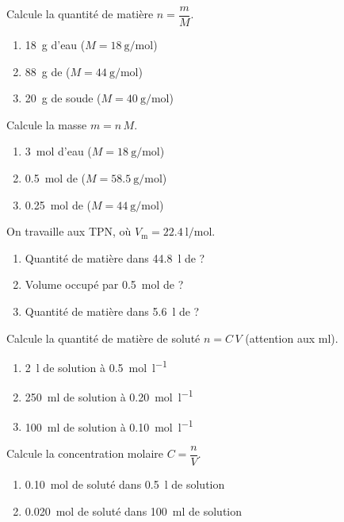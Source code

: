 \documentclass[11pt,a4paper]{article}
\begin{document}
\begin{exo}
Calcule la quantité de matière $n=\dfrac{m}{M}$.
\begin{enumerate}[label=\alph*)]
  \item \qty{18}{\gram} d'eau  \quad ($M=\qty{18}{\gram\per\mole}$)
  \item \qty{88}{\gram} de  \quad ($M=\qty{44}{\gram\per\mole}$)
  \item \qty{20}{\gram} de soude  \quad ($M=\qty{40}{\gram\per\mole}$)
\end{enumerate}
\end{exo}

\begin{exo}
Calcule la masse $m=n\,M$.
\begin{enumerate}[label=\alph*)]
  \item \qty{3}{\mole} d'eau \quad ($M=\qty{18}{\gram\per\mole}$)
  \item \qty{0.5}{\mole} de  \quad ($M=\qty{58.5}{\gram\per\mole}$)
  \item \qty{0.25}{\mole} de  \quad ($M=\qty{44}{\gram\per\mole}$)
\end{enumerate}
\end{exo}

\begin{exo}
On travaille aux TPN, où $V_{\mathrm{m}}=\qty{22.4}{\litre\per\mole}$.
\begin{enumerate}[label=\alph*)]
  \item Quantité de matière dans \qty{44.8}{\litre} de  ?
  \item Volume occupé par \qty{0.5}{\mole} de  ?
  \item Quantité de matière dans \qty{5.6}{\litre} de  ?
\end{enumerate}
\end{exo}

\begin{exo}
Calcule la quantité de matière de soluté $n=C\,V$ (attention aux \si{\milli\litre}).
\begin{enumerate}[label=\alph*)]
  \item \qty{2}{\litre} de solution à \qty{0.5}{\mole\per\litre}
  \item \qty{250}{\milli\litre} de solution à \qty{0.20}{\mole\per\litre}
  \item \qty{100}{\milli\litre} de solution à \qty{0.10}{\mole\per\litre}
\end{enumerate}
\end{exo}

\begin{exo}
Calcule la concentration molaire $C=\dfrac{n}{V}$.
\begin{enumerate}[label=\alph*)]
  \item \qty{0.10}{\mole} de soluté dans \qty{0.5}{\litre} de solution
  \item \qty{0.020}{\mole} de soluté dans \qty{100}{\milli\litre} de solution
\end{enumerate}
\end{exo}
\end{document}
